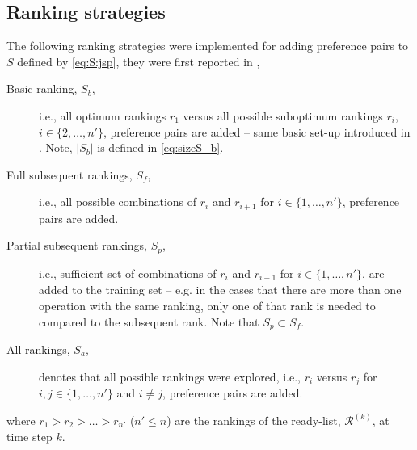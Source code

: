 \subsection{Ranking strategies}
The following ranking strategies were implemented for adding preference pairs to $S$ defined by \cref{eq:S:jsp}, they were first reported in \citet{InRu14b},
\begin{description}
\item[Basic ranking, $S_b$,] i.e., all optimum rankings $r_1$ versus all possible suboptimum rankings $r_i$, $i\in\{2,\ldots,n'\}$, preference pairs are added -- same basic set-up introduced in \cite{InRu11a}. Note, $|S_b|$ is defined in \cref{eq:sizeS_b}.
\item[Full subsequent rankings, $S_f$,] i.e., all possible combinations of $r_i$ and $r_{i+1}$ for $i\in\{1,\ldots,n'\}$, preference pairs are added.
\item[Partial subsequent rankings, $S_p$,] i.e., sufficient set of combinations of $r_i$ and $r_{i+1}$ for $i\in\{1,\ldots,n'\}$, are added to the training set -- e.g. in the cases that there are more than one operation with the same ranking, only one of that rank is needed to compared to the subsequent rank. Note that $S_p\subset S_f$.
\item[All rankings, $S_a$,] denotes that all possible rankings were explored, i.e.,
$r_i$ versus $r_j$ for $i,j\in\{1,\ldots,n'\}$ and $i\neq j$, preference pairs are added.
\end{description}
where $r_1>r_2>\ldots>r_{n'}$ ($n'\leq n$) are the rankings of the ready-list, $\mathcal{R}^{(k)}$, at time step $k$.


